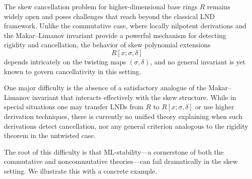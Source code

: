 \documentclass{amsart}
\theoremstyle{plain}
\numberwithin{theorem}{section}
\numberwithin{equation}{theorem}
\theoremstyle{definition}
\begin{document}
The skew cancellation problem for higher-dimensional base rings $R$ remains widely open and poses challenges that reach beyond the classical LND framework. Unlike the commutative case, where locally nilpotent derivations and the Makar--Limanov invariant provide a powerful mechanism for detecting rigidity and cancellation, the behavior of skew polynomial extensions
\[
    R[x;\sigma,\delta]
\]
depends intricately on the twisting maps $(\sigma,\delta)$, and no general invariant is yet known to govern cancellativity in this setting.



One major difficulty is the absence of a satisfactory analogue of the Makar--Limanov invariant that interacts effectively with the skew structure. While in special situations one may transfer LNDs from $R$ to $R[x;\sigma,\delta]$ or use higher derivation techniques, there is currently no unified theory explaining when such derivations detect cancellation, nor any general criterion analogous to the rigidity theorem in the untwisted case. 

The root of this difficulty is that ML-stability—a cornerstone of both the commutative and noncommutative theories—can fail dramatically in the skew setting. We illustrate this with a concrete example.
\end{document}
